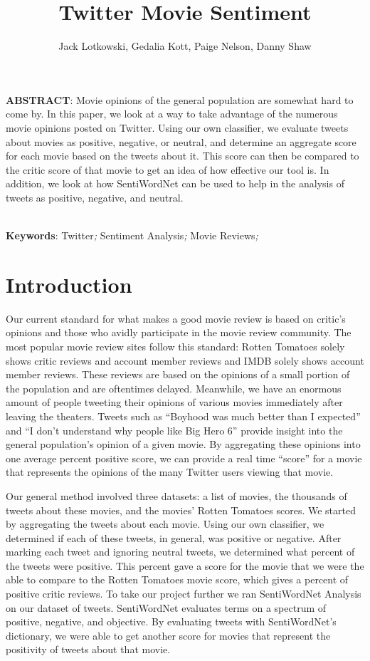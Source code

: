 \documentclass[12pt]{article}
\begin{document}
\title{Twitter Movie Sentiment}

\author{Jack Lotkowski, Gedalia Kott, Paige Nelson, Danny Shaw}

\maketitle


\noindent \textbf{ABSTRACT}:
Movie opinions of the general population are somewhat hard to come by. In this paper, we look at a 
way to take advantage of the numerous movie opinions posted on Twitter. Using our own classifier, we 
evaluate tweets about movies as positive, negative, or neutral, and determine an aggregate score for 
each movie based on the tweets about it. This score can then be compared to the critic score of that 
movie to get an idea of how effective our tool is. In addition, we look at how SentiWordNet \cite{Sentiword:2010} can be used 
to help in the analysis of tweets as positive, negative, and neutral.

~\\ 
\textbf{Keywords}: Twitter\textit{;} Sentiment Analysis\textit{;} Movie Reviews\textit{;}

\section{Introduction}\label{S:1}
Our current standard for what makes a good movie review is based on critic’s opinions and those who 
avidly participate in the movie review community. The most popular movie review sites follow this
standard: Rotten Tomatoes solely shows critic reviews and account member reviews and IMDB solely 
shows account member reviews. These reviews are based on the opinions of a small portion of the 
population and are oftentimes delayed. Meanwhile, we have an enormous amount of people tweeting 
their opinions of various movies immediately after leaving the theaters. Tweets such as “Boyhood was 
much better than I expected” and “I don’t understand why people like Big Hero 6” provide insight into 
the general population’s opinion of a given movie. By aggregating these opinions into one average 
percent positive score, we can provide a real time “score” for a movie that represents the opinions of 
the many Twitter users viewing that movie.

Our general method involved three datasets: a list of movies, the thousands of tweets about these 
movies, and the movies’ Rotten Tomatoes scores. We started by aggregating the tweets about each 
movie. Using our own classifier, we determined if each of these tweets, in general, was positive or 
negative. After marking each tweet and ignoring neutral tweets, we determined what 
percent of the tweets were positive. This percent gave a score for the movie that we were the able to 
compare to the Rotten Tomatoes movie score, which gives a percent of positive critic reviews.
To take our project further we ran SentiWordNet \cite{Sentiword:2010} Analysis on our dataset of tweets. SentiWordNet 
evaluates terms on a spectrum of positive, negative, and objective. By evaluating tweets with 
SentiWordNet’s dictionary, we were able to get another score for movies that represent the positivity of 
tweets about that movie.
\end{document}
